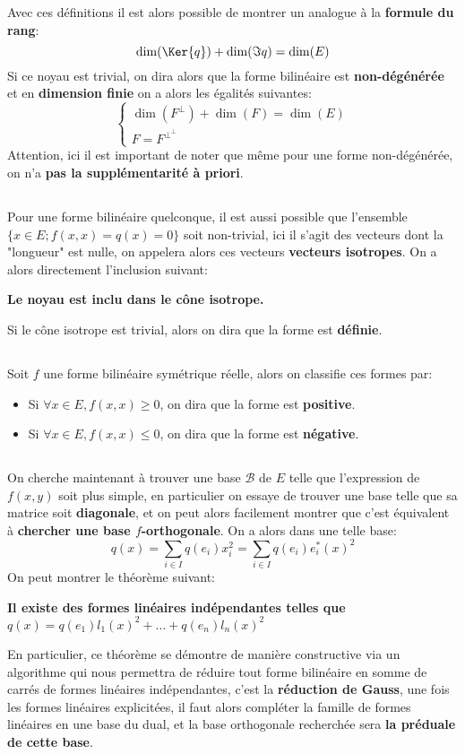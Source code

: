 Avec ces définitions il est alors possible de montrer un analogue à la \textbf{formule du rang}:
\[
   \dim(\Ker{q}) + \dim(\Im{q}) = \dim(E)
\]
Si ce noyau est trivial, on dira alors que la forme bilinéaire est \textbf{non-dégénérée} et en \textbf{dimension finie} on a alors les égalités suivantes:
\[
   \begin{cases}
      \dim(F^\perp) + \dim(F) = \dim(E)\\
      F = F^{\perp^\perp}
   \end{cases}
\]
Attention, ici il est important de noter que même pour une forme non-dégénérée, on n'a \textbf{pas la supplémentarité à priori}.
\subsection*{}
Pour une forme bilinéaire quelconque, il est aussi possible que l'ensemble \(\{ x \in E ; f(x, x) = q(x) = 0\}\) soit non-trivial, ici il s'agit des vecteurs dont la "longueur" est nulle, on appelera alors ces vecteurs \textbf{vecteurs isotropes}. On a alors directement l'inclusion suivant:
\begin{center}
   \textbf{Le noyau est inclu dans le cône isotrope.}
\end{center}
Si le cône isotrope est trivial, alors on dira que la forme est \textbf{définie}.
\subsection*{}
Soit \(f\) une forme bilinéaire symétrique réelle, alors on classifie ces formes par:
\begin{itemize}
   \item Si \(\forall x \in E, f(x, x) \geq 0\), on dira que la forme est \textbf{positive}.
   \item Si \(\forall x \in E, f(x, x) \leq 0\), on dira que la forme est \textbf{négative}.
\end{itemize}
\subsection*{}
On cherche maintenant à trouver une base \(\mathscr{B}\) de \(E\) telle que l'expression de \(f(x, y)\) soit plus simple, en particulier on essaye de trouver une base telle que sa matrice soit \textbf{diagonale}, et on peut alors facilement montrer que c'est équivalent à \textbf{chercher une base \(f\)-orthogonale}. On a alors dans une telle base:
\[
   q(x) = \sum_{i\in I}q(e_i)x_i^2 = \sum_{i \in I}q(e_i)e_i^*(x)^2
\]
On peut montrer le théorème suivant:
\begin{center}
   \textbf{Il existe des formes linéaires indépendantes telles que \(q(x) = q(e_1)l_1(x)^2+\ldots+q(e_n)l_n(x)^2\)}
\end{center}
En particulier, ce théorème se démontre de manière constructive via un algorithme qui nous permettra de réduire tout forme bilinéaire en somme de carrés de formes linéaires indépendantes, c'est la \textbf{réduction de Gauss}, une fois les formes linéaires explicitées, il faut alors compléter la famille de formes linéaires en une base du dual, et la base orthogonale recherchée sera \textbf{la préduale de cette base}.
